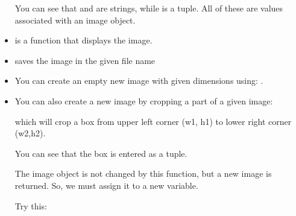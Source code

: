 \documentclass[letterpaper,10pt,english]{sphinxmanual}
\begin{document}
\begin{itemize}
You can see that  and  are strings, while
 is a tuple. All of these are values associated with an
image object.

\item {} 
 is a function that displays the image.

\item {} 
 saves the image in the given file name

\item {} 
You can create an empty new image with given dimensions using:
.

%
\begin{sphinxVerbatim}[commandchars=\\\{\}]
   
\end{sphinxVerbatim}

\item {} 
You can also create a new image by cropping a part of a given
image:

%
\begin{sphinxVerbatim}[commandchars=\\\{\}]
\end{sphinxVerbatim}

which will crop a box from upper left corner (w1, h1) to lower
right corner (w2,h2).

You can see that the box is entered as a tuple.

The image object  is not changed by this function, but a
new image is returned. So, we must assign it to a new variable.

Try this:

%
\begin{sphinxVerbatim}[commandchars=\\\{\}]
  
\end{sphinxVerbatim}


\end{itemize}
\end{document}
